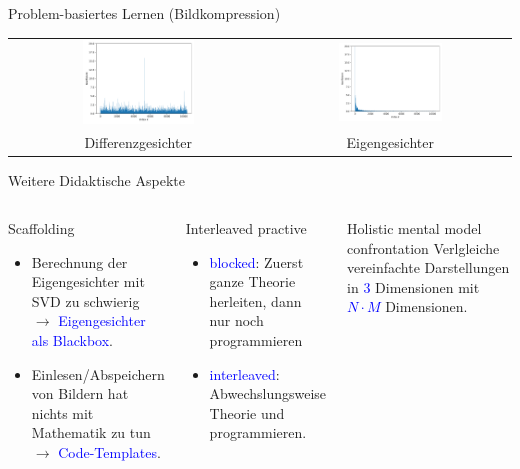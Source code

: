 \documentclass[10pt,aspectratio=169]{beamer}
\begin{document}
\begin{frame}[fragile]{Problem-basiertes Lernen (Bildkompression)}
\begin{tabular}{cc}
		\centering
		\includegraphics[width=0.45\textwidth]{images/eigenfaces/naive_coef} &
		\includegraphics[width=0.45\textwidth]{images/eigenfaces/eigen_coef} \\
		\phantom{text}Differenzgesichter & \phantom{text}Eigengesichter
	\end{tabular}
\end{frame}

\begin{frame}[fragile]{Weitere Didaktische Aspekte}
	\begin{columns}[T,onlytextwidth]
		\column{\textwidth}
		\begin{block}{Scaffolding}
			\begin{itemize}
				\item Berechnung der Eigengesichter mit SVD zu schwierig $\rightarrow$ \textcolor{blue}{Eigengesichter als Blackbox}.
				\item Einlesen/Abspeichern von Bildern hat nichts mit Mathematik zu tun $\rightarrow$ \textcolor{blue}{Code-Templates}.
			\end{itemize}
		\end{block}
		\begin{block}{Interleaved practive}
			\begin{itemize}
				\item \textcolor{blue}{blocked}: Zuerst ganze Theorie herleiten, dann nur noch programmieren
				\item \textcolor{blue}{interleaved}: Abwechslungsweise Theorie und programmieren.
			\end{itemize}
		\end{block}
		\begin{block}{Holistic mental model confrontation}
			Verlgleiche vereinfachte Darstellungen in \textcolor{blue}{3} Dimensionen mit \textcolor{blue}{$N\cdot M$} Dimensionen.
		\end{block}
	\end{columns}
\end{frame}
\end{document}
